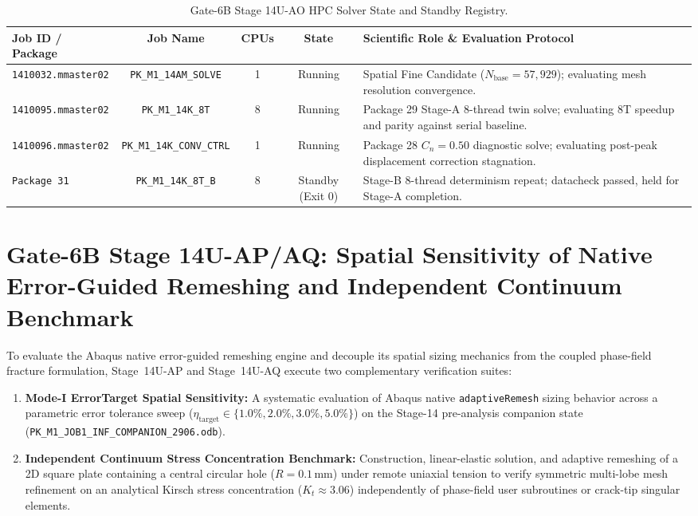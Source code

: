 \begin{table}[htbp]
\centering
\small
\caption{Gate-6B Stage 14U-AO HPC Solver State and Standby Registry.}
\label{tab:stage14uao_job_summary}
\begin{tabularx}{\textwidth}{l c c c X}
\toprule
\textbf{Job ID / Package} & \textbf{Job Name} & \textbf{CPUs} & \textbf{State} & \textbf{Scientific Role \& Evaluation Protocol} \\
\midrule
\texttt{1410032.mmaster02} & \texttt{PK\_M1\_14AM\_SOLVE} & 1 & Running & Spatial Fine Candidate ($N_{\mathrm{base}} = 57{,}929$); evaluating mesh resolution convergence. \\
\texttt{1410095.mmaster02} & \texttt{PK\_M1\_14K\_8T} & 8 & Running & Package 29 Stage-A 8-thread twin solve; evaluating 8T speedup and parity against serial baseline. \\
\texttt{1410096.mmaster02} & \texttt{PK\_M1\_14K\_CONV\_CTRL} & 1 & Running & Package 28 $C_n = 0.50$ diagnostic solve; evaluating post-peak displacement correction stagnation. \\
\texttt{Package 31} & \texttt{PK\_M1\_14K\_8T\_B} & 8 & Standby (Exit 0) & Stage-B 8-thread determinism repeat; datacheck passed, held for Stage-A completion. \\
\bottomrule
\end{tabularx}
\end{table}

\section{Gate-6B Stage 14U-AP/AQ: Spatial Sensitivity of Native Error-Guided Remeshing and Independent Continuum Benchmark}
\label{sec:stage14uap_spatial_sensitivity_and_hole_benchmark}

To evaluate the Abaqus native error-guided remeshing engine and decouple its spatial sizing mechanics from the coupled phase-field fracture formulation, Stage~14U-AP and Stage~14U-AQ execute two complementary verification suites:
\begin{enumerate}
  \item \textbf{Mode-I ErrorTarget Spatial Sensitivity:} A systematic evaluation of Abaqus native \texttt{adaptiveRemesh} sizing behavior across a parametric error tolerance sweep ($\eta_{\mathrm{target}} \in \{1.0\%, 2.0\%, 3.0\%, 5.0\%\}$) on the Stage-14 pre-analysis companion state (\texttt{PK\_M1\_JOB1\_INF\_COMPANION\_2906.odb}).
  \item \textbf{Independent Continuum Stress Concentration Benchmark:} Construction, linear-elastic solution, and adaptive remeshing of a 2D square plate containing a central circular hole ($R = 0.1\,\mathrm{mm}$) under remote uniaxial tension to verify symmetric multi-lobe mesh refinement on an analytical Kirsch stress concentration ($K_t \approx 3.06$) independently of phase-field user subroutines or crack-tip singular elements.
\end{enumerate}

